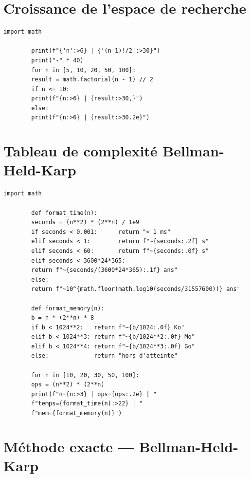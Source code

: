 \documentclass[12pt, a4paper, twoside, openright]{book}
\begin{document}
	\section{Croissance de l'espace de recherche}
	\label{ann:espace}
	
	\begin{lstlisting}[caption={Vérification numérique du Tableau~2.1 : nombre de tournées $(n-1)!/2$.}, label={lst:espace}]
		import math
		
		print(f"{'n':>6} | {'(n-1)!/2':>30}")
		print("-" * 40)
		for n in [5, 10, 20, 50, 100]:
		result = math.factorial(n - 1) // 2
		if n <= 10:
		print(f"{n:>6} | {result:>30,}")
		else:
		print(f"{n:>6} | {result:>30.2e}")
	\end{lstlisting}
	
	\section{Tableau de complexité Bellman-Held-Karp}
	\label{ann:bhk_table}
	
	\begin{lstlisting}[caption={Calcul automatique des temps et mémoires du Tableau~2.2.}, label={lst:bhk_table}]
		import math
		
		def format_time(n):
		seconds = (n**2) * (2**n) / 1e9
		if seconds < 0.001:      return "< 1 ms"
		elif seconds < 1:        return f"~{seconds:.2f} s"
		elif seconds < 60:       return f"~{seconds:.0f} s"
		elif seconds < 3600*24*365:
		return f"~{seconds/(3600*24*365):.1f} ans"
		else:
		return f"~10^{math.floor(math.log10(seconds/31557600))} ans"
		
		def format_memory(n):
		b = n * (2**n) * 8
		if b < 1024**2:   return f"~{b/1024:.0f} Ko"
		elif b < 1024**3: return f"~{b/1024**2:.0f} Mo"
		elif b < 1024**4: return f"~{b/1024**3:.0f} Go"
		else:             return "hors d'atteinte"
		
		for n in [10, 20, 30, 50, 100]:
		ops = (n**2) * (2**n)
		print(f"n={n:>3} | ops={ops:.2e} | "
		f"temps={format_time(n):>22} | "
		f"mem={format_memory(n)}")
	\end{lstlisting}
	
	\section{Méthode exacte --- Bellman-Held-Karp}
	\label{ann:bhk}
	
\end{document}
